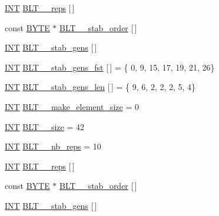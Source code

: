 \begin{DoxyCompactItemize}
\item 
\mbox{\hyperlink{galois_8h_a09fddde158a3a20bd2dcadb609de11dc}{I\+NT}} \mbox{\hyperlink{data___b_l_t_8_c_a1fd8b25452c800b18efea9eff3d9cc33}{B\+L\+T\+\_\+\_\+reps}} \mbox{[}$\,$\mbox{]}
\item 
const \mbox{\hyperlink{galois_8h_ab6cc7b4aeb6ea31aba2b3fbfc83ff5e6}{B\+Y\+TE}} $\ast$ \mbox{\hyperlink{data___b_l_t_8_c_ab0aeb4833b66a0e568461f07893ac774}{B\+L\+T\+\_\+\_\+stab\+\_\+order}} \mbox{[}$\,$\mbox{]}
\item 
\mbox{\hyperlink{galois_8h_a09fddde158a3a20bd2dcadb609de11dc}{I\+NT}} \mbox{\hyperlink{data___b_l_t_8_c_a4cf0a2da418e9d813bcec3cc8c5a09c1}{B\+L\+T\+\_\+\_\+stab\+\_\+gens}} \mbox{[}$\,$\mbox{]}
\item 
\mbox{\hyperlink{galois_8h_a09fddde158a3a20bd2dcadb609de11dc}{I\+NT}} \mbox{\hyperlink{data___b_l_t_8_c_a0182fd8e3e790931cb8e960032e2adec}{B\+L\+T\+\_\+\_\+stab\+\_\+gens\+\_\+fst}} \mbox{[}$\,$\mbox{]} = \{ 0, 9, 15, 17, 19, 21, 26\}
\item 
\mbox{\hyperlink{galois_8h_a09fddde158a3a20bd2dcadb609de11dc}{I\+NT}} \mbox{\hyperlink{data___b_l_t_8_c_ae52915c4b9e1a08bdbcc126e587fa367}{B\+L\+T\+\_\+\_\+stab\+\_\+gens\+\_\+len}} \mbox{[}$\,$\mbox{]} = \{ 9, 6, 2, 2, 2, 5, 4\}
\item 
\mbox{\hyperlink{galois_8h_a09fddde158a3a20bd2dcadb609de11dc}{I\+NT}} \mbox{\hyperlink{data___b_l_t_8_c_a632a2cff105e9d33f7973dcde1544457}{B\+L\+T\+\_\+\_\+make\+\_\+element\+\_\+size}} = 0
\item 
\mbox{\hyperlink{galois_8h_a09fddde158a3a20bd2dcadb609de11dc}{I\+NT}} \mbox{\hyperlink{data___b_l_t_8_c_a74802ccd535665185ad472ca01449553}{B\+L\+T\+\_\+\_\+size}} = 42
\item 
\mbox{\hyperlink{galois_8h_a09fddde158a3a20bd2dcadb609de11dc}{I\+NT}} \mbox{\hyperlink{data___b_l_t_8_c_a7d0cc9f83be69746b432d2bcfd41047a}{B\+L\+T\+\_\+\_\+nb\+\_\+reps}} = 10
\item 
\mbox{\hyperlink{galois_8h_a09fddde158a3a20bd2dcadb609de11dc}{I\+NT}} \mbox{\hyperlink{data___b_l_t_8_c_a49ba44c649db76fd27d2bcab6a814cb5}{B\+L\+T\+\_\+\_\+reps}} \mbox{[}$\,$\mbox{]}
\item 
const \mbox{\hyperlink{galois_8h_ab6cc7b4aeb6ea31aba2b3fbfc83ff5e6}{B\+Y\+TE}} $\ast$ \mbox{\hyperlink{data___b_l_t_8_c_ada436c9a32b08a93f3f59857f157693c}{B\+L\+T\+\_\+\_\+stab\+\_\+order}} \mbox{[}$\,$\mbox{]}
\item 
\mbox{\hyperlink{galois_8h_a09fddde158a3a20bd2dcadb609de11dc}{I\+NT}} \mbox{\hyperlink{data___b_l_t_8_c_a8ea154f34ad8d2e91b446c6f6d5ff299}{B\+L\+T\+\_\+\_\+stab\+\_\+gens}} \mbox{[}$\,$\mbox{]}

\end{DoxyCompactItemize}
